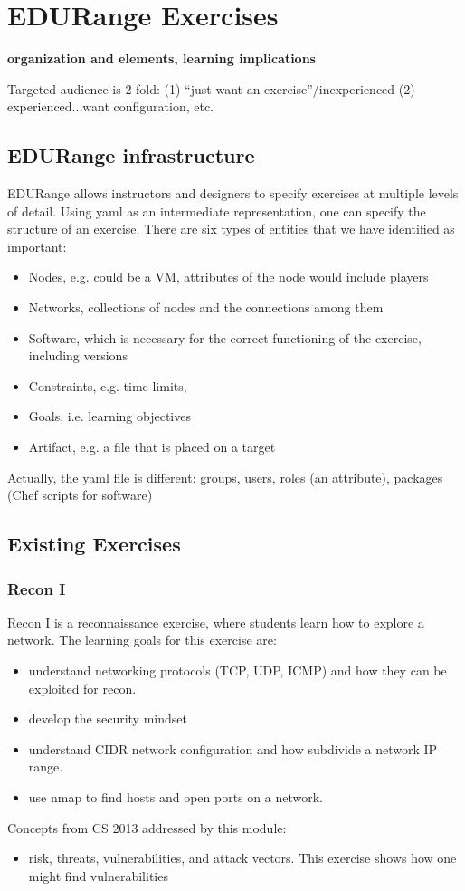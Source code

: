 \section*{EDURange Exercises}

{\bf organization and elements, learning implications}

 Targeted audience is 2-fold: (1) ``just want an exercise''/inexperienced
 (2) experienced...want configuration, etc.

\subsection{EDURange infrastructure}
EDURange allows instructors and designers to specify exercises at multiple levels of detail.
Using yaml as an intermediate representation, one can specify the structure of an exercise.
There are six types of entities that we have identified as important:
\begin{itemize}
  \item Nodes, e.g. could be a VM, attributes of the node would include players
  \item Networks,  collections of nodes and the connections among them
  \item Software, which is necessary for the correct functioning of the exercise, including versions
  \item Constraints, e.g. time limits, 
  \item Goals, i.e. learning objectives
  \item Artifact, e.g. a file that is placed on a target
\end{itemize}
Actually, the yaml file is different: groups, users, roles (an attribute), packages (Chef scripts for software)


\subsection{Existing Exercises}
\subsubsection{Recon I}
Recon I  is a reconnaissance exercise, where students learn how to explore a network.
The learning goals for this exercise are:
\begin{itemize}
\item understand networking protocols (TCP, UDP, ICMP) and how they can be exploited for recon.
\item develop the security mindset
\item understand CIDR network configuration and how subdivide a network IP range.
\item use nmap to find hosts and open ports on a network.
\end{itemize}
Concepts from CS 2013 addressed by this module:
\begin{itemize}
\item  risk, threats, vulnerabilities, and attack vectors.  This exercise shows how one might 
  find vulnerabilities
\end{itemize}


